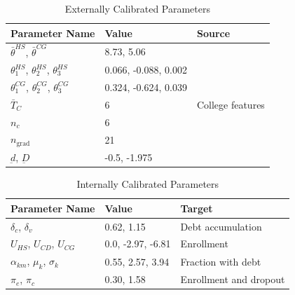   \begin{table}[H]
    \begin{tabular}{lll}
      \toprule
      \textbf{Parameter Name} & \textbf{Value} & \textbf{Source} \\
      \midrule
      $\bar{\theta}^{HS}$, $\bar{\theta}^{CG}$ & 8.73, 5.06 & \cite{PSID} \\
      $\theta_1^{HS}$, $\theta_2^{HS}$, $\theta_3^{HS}$ & 0.066, -0.088, 0.002 & \\
      $\theta_1^{CG}$, $\theta_2^{CG}$, $\theta_3^{CG}$ & 0.324, -0.624, 0.039 & \\
      \midrule
      $\bar{T}_C$ & 6 & College features \\
      $n_c$ & 6 & \\
      $n_{\text{grad}}$ & 21 & \\
      $\underbar{d}$, $\underbar{D}$ & -0.5, -1.975 & \\
      \bottomrule
    \end{tabular}
    \caption{Externally Calibrated Parameters}
    \label{table:ec}
  \end{table}

  \begin{table}[H]
    \begin{tabular}{lll}
      \toprule
      \textbf{Parameter Name} & \textbf{Value} & \textbf{Target} \\
      \midrule
      $\delta_c$, $\delta_v$ & 0.62, 1.15 & Debt accumulation \\
      $U_{HS}$, $U_{CD}$, $U_{CG}$ & 0.0, -2.97, -6.81 & Enrollment \\
      $\alpha_{km}$, $\mu_k$, $\sigma_k$ & 0.55, 2.57, 3.94 & Fraction with debt \\
      $\pi_e$, $\pi_c$ & 0.30, 1.58 & Enrollment and dropout \\
      \bottomrule
    \end{tabular}
    \caption{Internally Calibrated Parameters}
    \label{table:ic}
  \end{table}

